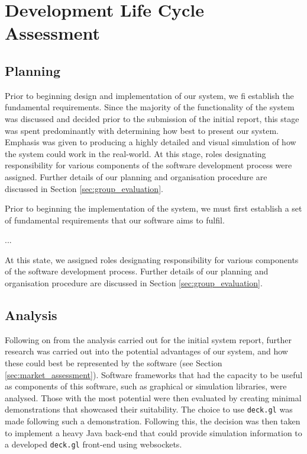 \section{Development Life Cycle Assessment}

\subsection{Planning}

Prior to beginning design and implementation of our system, we fi establish the fundamental requirements. Since the majority of the functionality of the system was discussed and decided prior to the submission of the initial report, this stage was spent predominantly with determining how best to present our system. Emphasis was given to producing a highly detailed and visual simulation of how the system could work in the real-world. At this stage, roles designating responsibility for various components of the software development process were assigned. Further details of our planning and organisation  procedure are discussed in Section \ref{sec:group_evaluation}.

Prior to beginning the implementation of the system, we must first establish a set of fundamental requirements that our software aims to fulfil. 

...

At this state, we assigned roles designating responsibility for various components of the software development process. Further details of our planning and organisation procedure are discussed in Section \ref{sec:group_evaluation}.

\subsection{Analysis}

Following on from the analysis carried out for the initial system report, further research was carried out into the potential advantages of our system, and how these could best be represented by the software (see Section \ref{sec:market_assessment}). Software frameworks that had the capacity to be useful as components of this software, such as graphical or simulation libraries, were analysed. Those with the most potential were then evaluated by creating minimal demonstrations that showcased their suitability. The choice to use \lstinline{deck.gl} was made following such a demonstration. Following this, the decision was then taken to implement a heavy Java back-end that could provide simulation information to a developed \lstinline{deck.gl} front-end using websockets.

